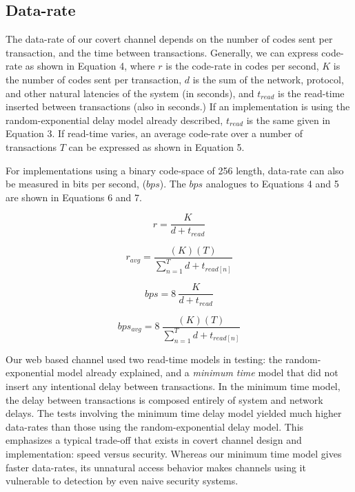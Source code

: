 \documentclass[10pt, conference]{IEEEtran}
\begin{document}
\subsection{Data-rate}
The data-rate of our covert channel depends on the number of codes sent per transaction, and the time between transactions.  Generally, we can express code-rate as shown in Equation 4, where $r$ is the code-rate in codes per second, $K$ is the number of codes sent per transaction, $d$ is the sum of the network, protocol, and other natural latencies of the system (in seconds), and $t_{read}$ is the read-time inserted between transactions (also in seconds.)  If an implementation is using the random-exponential delay model already described, $t_{read}$ is the same given in Equation 3.  If read-time varies, an average code-rate over a number of transactions $T$ can be expressed as shown in Equation 5.

For implementations using a binary code-space of 256 length, data-rate can also be measured in bits per second, ($bps$).  The $bps$ analogues to Equations 4 and 5 are shown in Equations 6 and 7.

\begin{equation}
  r = \frac{K}{d+t_{read}}
\end{equation}

\begin{equation}
  r_{avg} = \frac{(K)(T)}{\sum\limits_{n = 1}^{T} d+t_{read[n]}}
\end{equation}

\begin{equation}
  bps = 8\ \frac{K}{d+t_{read}}
\end{equation}

\begin{equation}
  bps_{avg} = 8\ \frac{(K)(T)}{\sum\limits_{n = 1}^{T} d+t_{read[n]}}
\end{equation}

Our web based channel used two read-time models in testing: the random-exponential model already explained, and a {\em minimum time} model that did not insert any intentional delay between transactions.  In the minimum time model, the delay between transactions is composed entirely of system and network delays.  The tests involving the minimum time delay model yielded much higher data-rates than those using the random-exponential delay model.  This emphasizes a typical trade-off that exists in covert channel design and implementation: speed versus security.  Whereas our minimum time model gives faster data-rates, its unnatural access behavior makes channels using it vulnerable to detection by even naive security systems.
\end{document}
